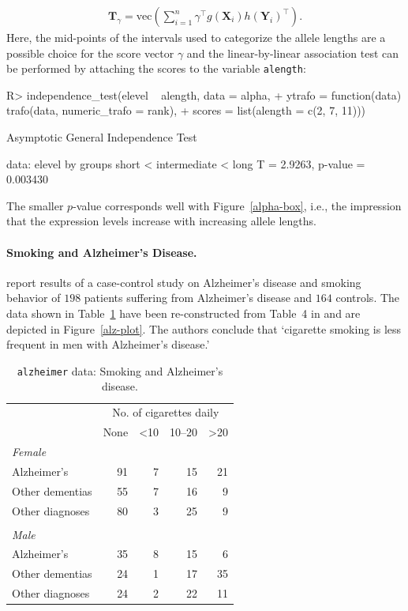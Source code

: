 \documentclass{article}
\newcommand{\Robject}[1]{\texttt{#1}}
\newcommand{\X}{\mathbf{X}}
\newcommand{\Y}{\mathbf{Y}}
\newcommand{\T}{\mathbf{T}}
\renewcommand{\vec}{\text{vec}}
\newenvironment{Schunk}{}{}
\begin{document}
\begin{eqnarray*}
\T_\gamma = \vec \left( \sum_{i=1}^n \gamma^\top g(\X_i)
            h(\Y_i)^\top \right).
\end{eqnarray*}
Here, the mid-points of the intervals used to categorize the allele lengths
are a possible choice for the score vector $\gamma$ and the linear-by-linear
association test can be performed by attaching the scores to the variable
\Robject{alength}:
\begin{Schunk}
\begin{Sinput}
R> independence_test(elevel ~ alength, data = alpha, 
+     ytrafo = function(data) trafo(data, numeric_trafo = rank), 
+     scores = list(alength = c(2, 7, 11)))
\end{Sinput}
\begin{Soutput}
	Asymptotic General Independence Test

data:  elevel by
	 groups short < intermediate < long 
T = 2.9263, p-value = 0.003430
\end{Soutput}
\end{Schunk}
The smaller $p$-value corresponds well with Figure~\ref{alpha-box}, i.e., 
the impression that the expression levels increase with increasing 
allele lengths. 

\paragraph{Smoking and Alzheimer's Disease.}


\cite{SalibHillier1997} report results of a case-control study on
Alzheimer's disease and smoking behavior of 
$198$
patients suffering from Alzheimer's disease and 
$164$
controls. The data shown in Table~\ref{alzheimertab} have been 
re-constructed from Table~4 in \cite{SalibHillier1997} and are depicted in
Figure~\ref{alz-plot}. 
The authors conclude that `cigarette smoking is less frequent in 
men with Alzheimer's disease.' 

\begin{table}[h]
\begin{center}
\caption{\Robject{alzheimer} data: Smoking and Alzheimer's disease. \label{alzheimertab}}
\begin{tabular}{lrrrr} \hline \hline
 & \multicolumn{4}{c}{No. of cigarettes daily} \\
 & None & <10 & 10--20 & >20 \\ \hline
\textit{Female} & & & & \\
Alzheimer's  &  91 & 7 & 15 & 21 \\ 
Other dementias  &  55 & 7 & 16 & 9 \\ 
Other diagnoses  &  80 & 3 & 25 & 9 \\ 
& & & & \\
\textit{Male} & & & & \\
Alzheimer's  &  35 & 8 & 15 & 6 \\ 
Other dementias  &  24 & 1 & 17 & 35 \\ 
Other diagnoses  &  24 & 2 & 22 & 11 \\ \hline
\end{tabular}
\end{center}
\end{table}
\end{document}
